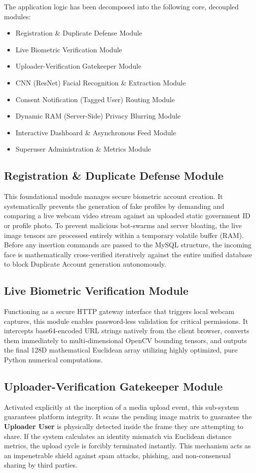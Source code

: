 The application logic has been decomposed into the following core, decoupled modules:

\begin{itemize}
    \item Registration \& Duplicate Defense Module
    \item Live Biometric Verification Module
    \item Uploader-Verification Gatekeeper Module
    \item CNN (ResNet) Facial Recognition \& Extraction Module
    \item Consent Notification (Tagged User) Routing Module
    \item Dynamic RAM (Server-Side) Privacy Blurring Module
    \item Interactive Dashboard \& Asynchronous Feed Module
    \item Superuser Administration \& Metrics Module
\end{itemize}

\subsection{Registration \& Duplicate Defense Module}
This foundational module manages secure biometric account creation. It systematically prevents the generation of fake profiles by demanding and comparing a live webcam video stream against an uploaded static government ID or profile photo. To prevent malicious bot-swarms and server bloating, the live image tensors are processed entirely within a temporary volatile buffer (RAM). Before any insertion commands are passed to the MySQL structure, the incoming face is mathematically cross-verified iteratively against the entire unified database to block Duplicate Account generation autonomously.

\subsection{Live Biometric Verification Module}
Functioning as a secure HTTP gateway interface that triggers local webcam captures, this module enables password-less validation for critical permissions. It intercepts base64-encoded URL strings natively from the client browser, converts them immediately to multi-dimensional OpenCV bounding tensors, and outputs the final 128D mathematical Euclidean array utilizing highly optimized, pure Python numerical computations.

\subsection{Uploader-Verification Gatekeeper Module}
Activated explicitly at the inception of a media upload event, this sub-system guarantees platform integrity. It scans the pending image matrix to guarantee the \textbf{Uploader User} is physically detected inside the frame they are attempting to share. If the system calculates an identity mismatch via Euclidean distance metrics, the upload cycle is forcibly terminated instantly. This mechanism acts as an impenetrable shield against spam attacks, phishing, and non-consensual sharing by third parties.

